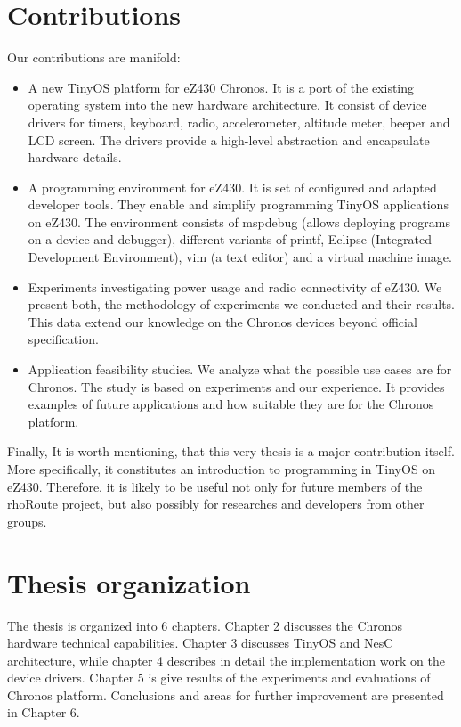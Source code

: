 \section{Contributions}
Our contributions are manifold:
\begin{itemize}
  \item A new TinyOS platform for eZ430 Chronos.
It is a port of the existing operating system into the new hardware architecture.
It consist of device drivers for timers, keyboard, radio, accelerometer, altitude meter, beeper and LCD screen.
The drivers provide a high-level abstraction and encapsulate hardware details.
  \item A programming environment for eZ430. It is set of configured and adapted developer tools. They enable and simplify programming TinyOS applications on eZ430.
The environment consists of mspdebug (allows deploying programs on a device and debugger), different variants of printf, Eclipse (Integrated Development Environment), vim (a text editor) and a virtual machine image.
  \item Experiments investigating power usage and radio connectivity of eZ430.
We present both, the methodology of experiments we conducted and their results.
This data extend our knowledge on the Chronos devices beyond official specification.
  \item Application feasibility studies.
We analyze what the possible use cases are for Chronos.
The study is based on experiments and our experience.
It provides examples of future applications and how suitable they are for the Chronos platform.
\end{itemize}

Finally, It is worth mentioning, that this very thesis is a major contribution itself. More specifically, it constitutes an introduction to programming in TinyOS on eZ430. Therefore, it is likely to be useful not only for future members of the rhoRoute project, but also possibly for researches and developers from other groups.

\section{Thesis organization}
The thesis is organized into 6 chapters. Chapter 2 discusses the Chronos hardware technical capabilities. Chapter 3 discusses TinyOS and NesC architecture, while chapter 4 describes in detail the implementation work on the device drivers. Chapter 5 is give results of the experiments and evaluations of Chronos platform. Conclusions and areas for further improvement are presented in Chapter 6.

